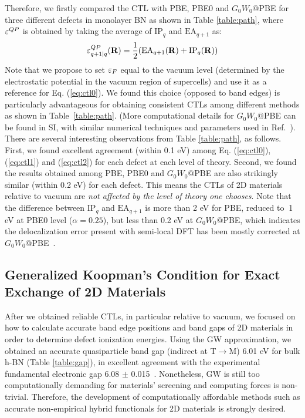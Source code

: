 Therefore, we firstly compared the CTL with PBE, PBE0 and $G_0W_0@$PBE for three different defects in monolayer BN as shown in Table \ref{table:path}, where $\varepsilon^{QP}$ is obtained by taking the average of $\text{IP}_q$ and $\text{EA}_{q+1}$ as:
\begin{equation}
\varepsilon^{QP}_{q+1|q}(\mathbf{R}) = \frac{1}{2}(\text{EA}_{q+1}(\mathbf{R}) + \text{IP}_q(\mathbf{R}))
\end{equation}
Note that we propose to set $\varepsilon_F$ equal to the vacuum level (determined by the electrostatic potential in the vacuum region of supercells) and use it as a reference for Eq. (\ref{eq:ctl0}).
We found this choice (opposed to band edges) is particularly advantageous for obtaining consistent CTLs among different methods as shown in Table~\ref{table:path}.
(More computational details for $G_0W_0@$PBE can be found in SI, with similar numerical techniques and parameters used in Ref.~\cite{wu2017first}). There are several interesting observations from Table \ref{table:path}, as follows. First, we found excellent agreement (within 0.1 eV) among Eq. (\ref{eq:ctl0}), (\ref{eq:ctl1}) and (\ref{eq:ctl2}) for each defect at each level of theory. Second, we found the results obtained among PBE, PBE0 and $G_0W_0@$PBE are also strikingly similar (within 0.2 eV) for each defect. This means the CTLs of 2D materials relative to vacuum are \textit{not affected by the level of theory one chooses}. Note that the difference between $\text{IP}_q$ and $\text{EA}_{q+1}$ is more than 2 eV for PBE, reduced to $~$1 eV at PBE0 level ($\alpha=0.25$), but less than 0.2 eV at $G_0W_0@$PBE, which indicates the delocalization error present with semi-local DFT has been mostly corrected at $G_0W_0$@PBE~\cite{bruneval2009g}.


\subsection{Generalized Koopman's Condition for Exact Exchange of 2D Materials}
After we obtained reliable CTLs, in particular relative to vacuum, we focused on how to calculate accurate band edge positions and band gaps of 2D materials in order to determine defect ionization energies. Using the GW approximation, we obtained an accurate quasiparticle band gap (indirect at T$\rightarrow$M) 6.01 eV for bulk h-BN (Table \ref{table:gap}), in excellent agreement with the experimental fundamental electronic gap 6.08 $\pm$ 0.015~\cite{cassabois2016hexagonal}. Nonetheless, GW is still too computationally demanding for materials' screening and computing forces is non-trivial. Therefore, the development of computationally affordable methods such as accurate non-empirical hybrid functionals for 2D materials is strongly desired.

